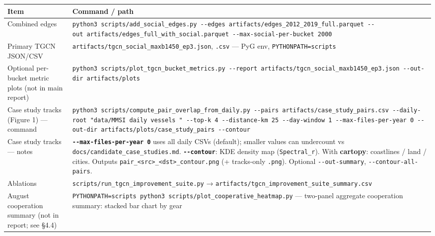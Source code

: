 \documentclass[
]{article}
\newcounter{none} %
\begin{document}
{\def\LTcaptype{none} %
\begin{longtable}[]{@{}
  >{\raggedright\arraybackslash}p{}
  >{\raggedright\arraybackslash}p{}@{}}
\toprule\noalign{}
\begin{minipage}[b]{\linewidth}\raggedright
Item
\end{minipage} & \begin{minipage}[b]{\linewidth}\raggedright
Command / path
\end{minipage} \\
\midrule\noalign{}
\endhead
\bottomrule\noalign{}
\endlastfoot
Combined edges &
\texttt{python3\ scripts/add\_social\_edges.py\ -\/-edges\ artifacts/edges\_2012\_2019\_full.parquet\ -\/-out\ artifacts/edges\_full\_with\_social.parquet\ -\/-max-social-per-bucket\ 2000} \\
Primary TGCN JSON/CSV &
\texttt{artifacts/tgcn\_social\_maxb1450\_ep3.json}, \texttt{.csv} ---
PyG env, \texttt{PYTHONPATH=scripts} \\
Optional per-bucket metric plots (not in main report) &
\texttt{python3\ scripts/plot\_tgcn\_bucket\_metrics.py\ -\/-report\ artifacts/tgcn\_social\_maxb1450\_ep3.json\ -\/-out-dir\ artifacts/plots} \\
Case study tracks (Figure 1) --- command &
\texttt{python3\ scripts/compute\_pair\_overlap\_from\_daily.py\ -\/-pairs\ artifacts/case\_study\_pairs.csv\ -\/-daily-root\ "data/MMSI\ daily\ vessels\ "\ -\/-top-k\ 4\ -\/-distance-km\ 25\ -\/-day-window\ 1\ -\/-max-files-per-year\ 0\ -\/-out-dir\ artifacts/plots/case\_study\_pairs\ -\/-contour} \\
Case study tracks --- notes &
\textbf{\texttt{-\/-max-files-per-year\ 0}} uses all daily CSVs
(default); smaller values can undercount vs
\texttt{docs/candidate\_case\_studies.md}.
\textbf{\texttt{-\/-contour}}: KDE density map (\texttt{Spectral\_r}).
With \textbf{cartopy}: coastlines / land / cities. Outputs
\texttt{pair\_\textless{}src\textgreater{}\_\textless{}dst\textgreater{}\_contour.png}
(+ tracks-only \texttt{.png}). Optional \texttt{-\/-out-summary},
\texttt{-\/-contour-all-pairs}. \\
Ablations & \texttt{scripts/run\_tgcn\_improvement\_suite.py} →
\texttt{artifacts/tgcn\_improvement\_suite\_summary.csv} \\
August cooperation summary (not in report; see §4.4) &
\texttt{PYTHONPATH=scripts\ python3\ scripts/plot\_cooperative\_heatmap.py}
--- two-panel aggregate cooperation summary: stacked bar chart by gear

\end{longtable}}
\end{document}
